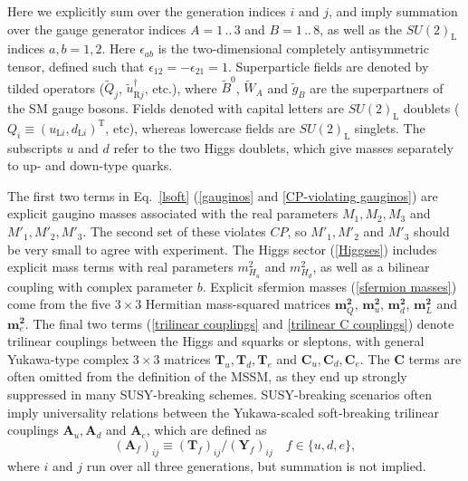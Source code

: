 \documentclass[pdftex,twocolumn,epjc3_preprint,runningheads]{svjour3}
\renewcommand{\_}{\discretionary{\underscore}{}{\underscore}}
\begin{document}
Here we explicitly sum over the generation indices $i$ and $j$, and imply summation over the gauge generator indices $A=1\,..\,3$ and $B=1\,..\,8$, as well as the $SU(2)_\mathrm{L}$ indices $a,b=1,2$.  Here $\epsilon_{ab}$ is the two-dimensional completely antisymmetric tensor, defined such that $\epsilon_{12} = -\epsilon_{21} = 1$.  Superparticle fields are denoted by tilded operators ($\tilde{Q}_j$, $\tilde{u}^\dagger_{\mathrm{R}j}$, etc.), where $\tilde{B}^0$, $\tilde{W}_A$ and $\tilde{g}_B$ are the superpartners of the SM gauge bosons.  Fields denoted with capital letters are $SU(2)_\mathrm{L}$ doublets ($Q_i\equiv(u_{\mathrm{L}i},d_{\mathrm{L}i})^\mathrm{T}$, etc), whereas lowercase fields are $SU(2)_\mathrm{L}$ singlets. The subscripts $u$ and $d$ refer to the two Higgs doublets, which give masses separately to up- and down-type quarks.

The first two terms in Eq.~\ref{lsoft} (\ref{gauginos} and \ref{CP-violating gauginos}) are explicit gaugino masses associated with the real parameters $M_1,M_2,M_3$ and $M'_1,M'_2,M'_3$.  The second set of these violates $CP$, so $M'_1,M'_2$ and $M'_3$ should be very small to agree with experiment.  The Higgs sector (\ref{Higgses}) includes explicit mass terms with real parameters $m^2_{H_u}$ and $m^2_{H_d}$, as well as a bilinear coupling with complex parameter $b$.  Explicit sfermion masses (\ref{sfermion masses}) come from the five $3\times3$ Hermitian mass-squared matrices $\mathbf{m}^\mathbf{2}_Q$, $\mathbf{m}^\mathbf{2}_u$, $\mathbf{m}^\mathbf{2}_d$, $\mathbf{m}^\mathbf{2}_L$ and $\mathbf{m}^\mathbf{2}_e$.  The final two terms (\ref{trilinear couplings} and \ref{trilinear C couplings}) denote trilinear couplings between the Higgs and squarks or sleptons, with general Yukawa-type complex $3\times3$ matrices $\mathbf{T}_u, \mathbf{T}_d, \mathbf{T}_e$ and $\mathbf{C}_u, \mathbf{C}_d, \mathbf{C}_e$.  The $\mathbf{C}$ terms are often omitted from the definition of the MSSM, as they end up strongly suppressed in many SUSY-breaking schemes.  SUSY-breaking scenarios often imply universality relations between the Yukawa-scaled soft-breaking trilinear couplings $\mathbf{A}_u, \mathbf{A}_d$ and $\mathbf{A}_e$,  which are defined as
\begin{equation}
(\mathbf{A}_f)_{ij} \equiv (\mathbf{T}_f)_{ij}/(\mathbf{Y}_f)_{ij} \quad f \in \{u,d,e\},
\end{equation}
where $i$ and $j$ run over all three generations, but summation is not implied.
\end{document}
